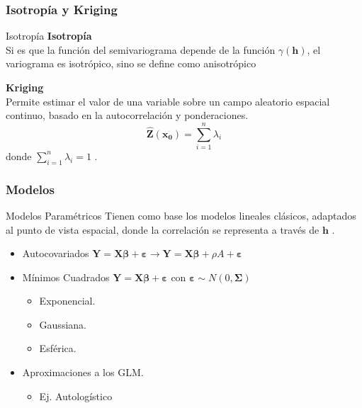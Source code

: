 \subsubsection{Isotrop\'ia y Kriging}
\begin{frame}{Isotrop\'ia}
\textbf{Isotrop\'ia}\\
Si es que la funci\'on del semivariograma depende de la funci\'on $\gamma(\mathbf{h})$, el variograma es isotr\'opico, sino se define como anisotr\'opico\vspace{\baselineskip}

\textbf{Kriging}\\
Permite estimar el valor de una variable sobre un campo aleatorio espacial continuo, basado en la autocorrelaci\'on y ponderaciones.
\begin{equation}
   \mathbf{\hat{Z}(x_0)} = \sum_{i=1}^{n}\lambda_i
\end{equation}
donde $\sum_{i=1}^n\lambda_i = 1$ \cite{FischerHandbook2010}.
\end{frame}
\subsubsection{Modelos}
\begin{frame}{Modelos Param\'etricos}
Tienen como base los modelos lineales cl\'asicos, adaptados al punto de vista espacial, donde la correlaci\'on se representa a trav\'es  de $\mathbf{h}$ \cite{Dormann2007}. 
\begin{itemize}
    \item Autocovariados $\mathbf{Y} = \mathbf{X} \boldsymbol{ \beta } + \boldsymbol{\varepsilon} \rightarrow \mathbf{Y}=\mathbf{X}\boldsymbol{ \beta }+\rho A+\boldsymbol{\varepsilon}$
    \item M\'inimos Cuadrados $\mathbf{Y} = \mathbf{X} \boldsymbol{ \beta } + \boldsymbol{\varepsilon}$ con $ \boldsymbol{\varepsilon} \sim N (0,\boldsymbol{\Sigma})$
    \begin{itemize}
    \item Exponencial.
    \item Gaussiana.
    \item Esf\'erica.
    \end{itemize}
    \item Aproximaciones a los GLM.
    \begin{itemize}
        \item Ej. Autolog\'istico \cite{Dormann2007}
    \end{itemize}
    
\end{itemize}

\end{frame}

